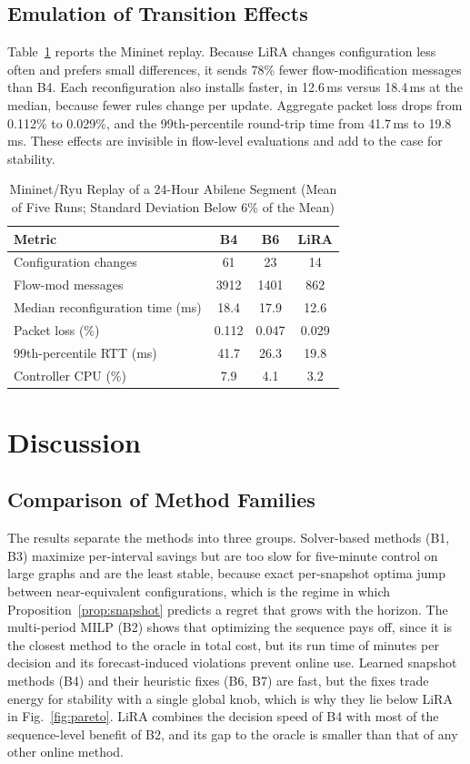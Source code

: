 \documentclass[journal]{IEEEtran}
\begin{document}
\subsection{Emulation of Transition Effects}

Table~\ref{tab:emu} reports the Mininet replay. Because LiRA changes configuration less often and prefers small differences, it sends 78\% fewer flow-modification messages than B4. Each reconfiguration also installs faster, in 12.6\,ms versus 18.4\,ms at the median, because fewer rules change per update. Aggregate packet loss drops from 0.112\% to 0.029\%, and the 99th-percentile round-trip time from 41.7\,ms to 19.8\,ms. These effects are invisible in flow-level evaluations and add to the case for stability.

\begin{table}[t]
\centering
\caption{Mininet/Ryu Replay of a 24-Hour Abilene Segment (Mean of Five Runs; Standard Deviation Below 6\% of the Mean)}
\label{tab:emu}
\footnotesize
\setlength{\tabcolsep}{4pt}
\begin{tabular}{@{}lccc@{}}
\toprule
Metric & B4 & B6 & LiRA \\
\midrule
Configuration changes & 61 & 23 & 14 \\
Flow-mod messages & 3912 & 1401 & 862 \\
Median reconfiguration time (ms) & 18.4 & 17.9 & 12.6 \\
Packet loss (\%) & 0.112 & 0.047 & 0.029 \\
99th-percentile RTT (ms) & 41.7 & 26.3 & 19.8 \\
Controller CPU (\%) & 7.9 & 4.1 & 3.2 \\
\bottomrule
\end{tabular}
\end{table}

\section{Discussion}\label{sec:discussion}

\subsection{Comparison of Method Families}

The results separate the methods into three groups. Solver-based methods (B1, B3) maximize per-interval savings but are too slow for five-minute control on large graphs and are the least stable, because exact per-snapshot optima jump between near-equivalent configurations, which is the regime in which Proposition~\ref{prop:snapshot} predicts a regret that grows with the horizon. The multi-period MILP (B2) shows that optimizing the sequence pays off, since it is the closest method to the oracle in total cost, but its run time of minutes per decision and its forecast-induced violations prevent online use. Learned snapshot methods (B4) and their heuristic fixes (B6, B7) are fast, but the fixes trade energy for stability with a single global knob, which is why they lie below LiRA in Fig.~\ref{fig:pareto}. LiRA combines the decision speed of B4 with most of the sequence-level benefit of B2, and its gap to the oracle is smaller than that of any other online method.
\end{document}
